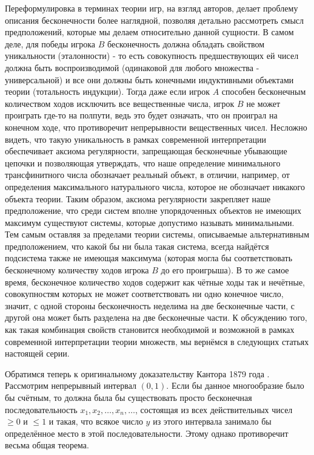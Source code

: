 \documentclass[12pt]{article}
\begin{document}
Переформулировка в терминах теории игр, на взгляд авторов, делает проблему описания бесконечности более наглядной, позволяя детально рассмотреть смысл предположений, которые мы делаем относительно данной сущности. В самом деле, для победы игрока $B$ бесконечность должна обладать свойством уникальности (эталонности) - то есть совокупность предшествующих ей чисел должна быть воспроизводимой (одинаковой для любого множества - универсальной) и все они должны быть конечными индуктивными объектами теории (тотальность индукции). Тогда даже если игрок $A$ способен бесконечным количеством ходов исключить все вещественные числа, игрок $B$ не может проиграть где-то на полпути, ведь это будет означать, что он проиграл на конечном ходе, что противоречит непрерывности вещественных чисел. Несложно видеть, что такую уникальность в рамках современной интерпретации обеспечивает аксиома регулярности, запрещающая бесконечные убывающие цепочки и позволяющая утверждать, что наше определение минимального трансфинитного числа обозначает реальный объект, в отличии, например, от определения максимального натурального числа, которое не обозначает никакого объекта теории. Таким образом, аксиома регулярности закрепляет наше предположение, что среди систем вполне упорядоченных объектов не имеющих максимум существуют системы, которые допустимо называть минимальными. Тем самым оставляя за пределами теории системы, описываемые альтернативным предположением, что какой бы ни была такая система, всегда найдётся подсистема также не имеющая максимума (которая могла бы соответствовать бесконечному количеству ходов игрока $B$ до его проигрыша). В то же самое время, бесконечное количество ходов содержит как чётные ходы так и нечётные, совокупностям которых не может соответствовать ни одно конечное число, значит, с одной стороны бесконечность неделима на две бесконечные части, с другой она может быть разделена на две бесконечные части. К обсуждению того, как такая комбинация свойств становится необходимой и возможной в рамках современной интерпретации теории множеств, мы вернёмся в следующих статьях настоящей серии.

Обратимся теперь к оригинальному доказательству Кантора 1879 года \cite{cantor-original}. Рассмотрим непрерывный интервал $(0, 1)$. Если бы данное многообразие было бы счётным, то должна была бы существовать просто бесконечная последовательность $x_1, x_2, \dots, x_n, \dots$, состоящая из всех действительных чисел $\geq 0$ и $\leq 1$ и такая, что всякое число $y$ из этого интервала занимало бы определённое место в этой последовательности. Этому однако противоречит весьма общая теорема.
\end{document}

